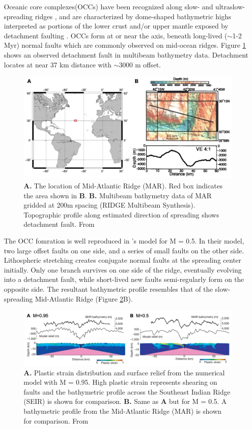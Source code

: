 \documentclass[letterpaper,12pt,notitle]{memphisthesis}                     %
\begin{document}
Oceanic core complexes(OCCs) have been recognized along slow- and ultraslow- spreading ridges \citep{Tucholke1998}, and are characterized by dome-shaped bathymetric highs interpreted as portions of the lower crust and/or upper mantle exposed by detachment faulting \citep{Tucholke1994}. OCCs form at or near the axis, beneath long-lived ($\sim$1-2 Myr) normal faults which are commonly observed on mid-ocean ridges. Figure \ref{fig:occ} shows an observed detachment fault in multibeam bathymetry data. Detachment locates at near 37 km distance with $\sim$3000 m offset.
%
\begin{figure}[!htb]
	\centering
	\includegraphics[width=0.9\linewidth]{./figs/occ.png}
	\caption{\textbf{A.} The location of Mid-Atlantic Ridge (MAR). Red box indicates the area shown in \textbf{B}. \textbf{B.} Multibeam bathymetry data of MAR gridded at 200m spacing (RIDGE Multibeam Synthesis). Topographic profile along estimated direction of spreading shows detachment fault. From \citet{Lavier2000}}
	\label{fig:occ}
\end{figure}
%
The OCC fomration is well reproduced in \citet{Buck2005}'s model for M = 0.5. In their model, two large offset faults on one side, and a series of small faults on the other side. Lithospheric stretching creates conjugate normal faults at the spreading center initially. Only one branch survives on one side of the ridge, eventually evolving into a detachment fault, while short-lived new faults semi-regularly form on the opposite side. The resultant bathymetric profile resembles that of the slow-spreading Mid-Atlantic Ridge (Figure \ref{fig:mfactor}B).
%
\begin{figure}[!htb]
	\centering
	\includegraphics[width=0.99\linewidth]{./figs/fig1.png}
	\caption{\textbf{A.} Plastic strain distribution and surface relief from the numerical model with M = 0.95. High plastic strain represents shearing on faults and the bathymetric profile across the Southeast Indian Ridge (SEIR) is shown for comparison. \textbf{B.} Same as \textbf{A} but for M = 0.5. A bathymetric profile from the Mid-Atlantic Ridge (MAR) is shown for comparison. From \citet{Buck2005}}
	\label{fig:mfactor}
\end{figure}
\end{document}
